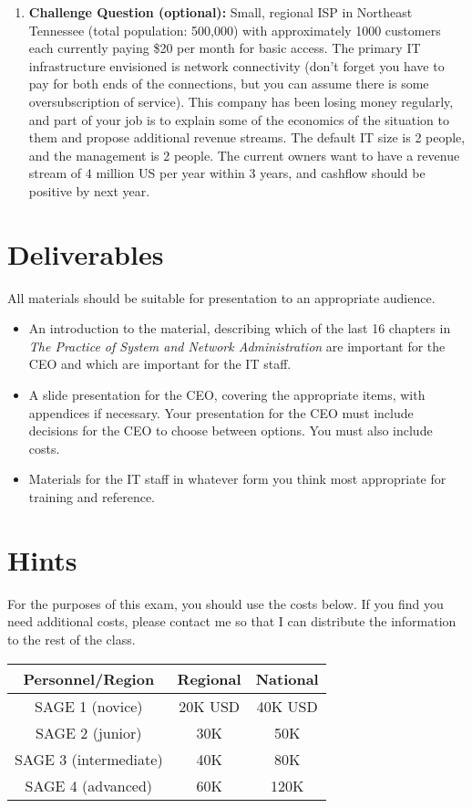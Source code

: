 \documentclass{exam}
\begin{document}
\begin{questions}
\begin{enumerate}
\item {\bf Challenge Question (optional):} Small, regional ISP in
  Northeast Tennessee (total population: 500,000) with 
  approximately 1000 customers each currently paying \$20 per
  month for basic access.  The primary IT infrastructure envisioned is
  network connectivity (don't forget you have to pay for both ends of the
  connections, but you can assume there is some oversubscription of 
  service).  This company has been losing money regularly, and part of your
  job is to explain some of the economics of the situation to them and 
  propose additional revenue streams.  The default IT size is 2 people, and
  the management is 2 people.  The current owners want to have a revenue
  stream of 4 million US per year within 3 years, and cashflow should be
  positive by next year.

\end{enumerate}

\section*{Deliverables}

All materials should be suitable for presentation to an appropriate audience.

\begin{itemize}
\item An introduction to the material, describing which  of the last
  16 chapters in
  \emph{The Practice of System and Network Administration} are important
  for the CEO and which are important for the IT staff.
\item A slide presentation for the CEO, covering the appropriate items, 
  with appendices if necessary.  Your presentation for the CEO must include
  decisions for the CEO to choose between options.  You must also include
  costs.
\item Materials for the IT staff in whatever form you think most 
  appropriate for training and reference.
\end{itemize}

\section*{Hints}

For the purposes of this exam, you should use the costs below.  If you find
you need additional costs, please contact me so that I can distribute the
information to the rest of the class.

\begin{tabular}{|c|c|c|}
\hline
{\bf Personnel/Region} & {\bf Regional} & {\bf National}\\
\hline
SAGE 1 (novice) & 20K USD & 40K USD \\
SAGE 2 (junior) & 30K & 50K \\
SAGE 3 (intermediate) & 40K & 80K \\
SAGE 4 (advanced) & 60K & 120K\\
\hline
\end{tabular}


\end{questions}
\end{document}
